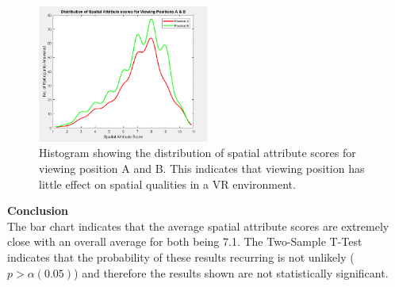 		\begin{figure}
			\includegraphics[width=0.5\textwidth]{images/stats/AvsB_sa_stack_all.PNG}
			\caption{Histogram showing the distribution of spatial attribute scores for viewing position A and B. This indicates that viewing position has little effect on spatial qualities in a VR environment.}
			\label{image:AvsB_dist} 
		\end{figure}

		\textbf{Conclusion}\\

		The bar chart indicates that the average spatial attribute scores are extremely close with an overall average for both being 7.1. The Two-Sample T-Test indicates that the probability of these results recurring is not unlikely ($p > \alpha (0.05)$) and therefore the results shown are not statistically significant.

